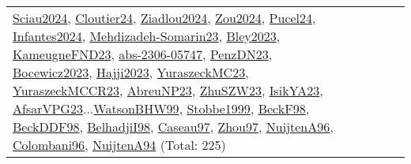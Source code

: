 {\begin{longtable}{p{3cm}r>{\raggedright\arraybackslash}p{6cm}>{\raggedright\arraybackslash}p{6cm}>{\raggedright\arraybackslash}p{8cm}}
\hyperref[detail:Sciau2024]{Sciau2024}, \hyperref[detail:Cloutier24]{Cloutier24}, \hyperref[detail:Ziadlou2024]{Ziadlou2024}, \hyperref[detail:Zou2024]{Zou2024}, \hyperref[detail:Pucel24]{Pucel24}, \hyperref[detail:Infantes2024]{Infantes2024}, \hyperref[detail:Mehdizadeh-Somarin23]{Mehdizadeh-Somarin23}, \hyperref[detail:Bley2023]{Bley2023}, \hyperref[detail:KameugneFND23]{KameugneFND23}, \hyperref[detail:abs-2306-05747]{abs-2306-05747}, \hyperref[detail:PenzDN23]{PenzDN23}, \hyperref[detail:Bocewicz2023]{Bocewicz2023}, \hyperref[detail:Hajji2023]{Hajji2023}, \hyperref[detail:YuraszeckMC23]{YuraszeckMC23}, \hyperref[detail:YuraszeckMCCR23]{YuraszeckMCCR23}, \hyperref[detail:AbreuNP23]{AbreuNP23}, \hyperref[detail:ZhuSZW23]{ZhuSZW23}, \hyperref[detail:IsikYA23]{IsikYA23}, \hyperref[detail:AfsarVPG23]{AfsarVPG23}...\hyperref[detail:WatsonBHW99]{WatsonBHW99}, \hyperref[detail:Stobbe1999]{Stobbe1999}, \hyperref[detail:BeckF98]{BeckF98}, \hyperref[detail:BeckDDF98]{BeckDDF98}, \hyperref[detail:BelhadjiI98]{BelhadjiI98}, \hyperref[detail:Caseau97]{Caseau97}, \hyperref[detail:Zhou97]{Zhou97}, \hyperref[detail:NuijtenA96]{NuijtenA96}, \hyperref[detail:Colombani96]{Colombani96}, \hyperref[detail:NuijtenA94]{NuijtenA94} (Total: 225)\\

\end{longtable}}
